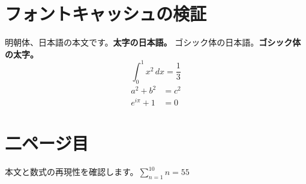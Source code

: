 \documentclass[a4paper,11pt]{ltjsarticle}
\begin{document}
\section{フォントキャッシュの検証}
明朝体、日本語の本文です。\textbf{太字の日本語。}
\textsf{ゴシック体の日本語。}\textsf{\textbf{ゴシック体の太字。}}
\begin{equation} \int_0^1 x^2\,dx = \frac{1}{3} \end{equation}
\begin{align} a^2+b^2&=c^2 \\ e^{i\pi}+1&=0 \end{align}
\newpage
\section{二ページ目}
本文と数式の再現性を確認します。\(\sum_{n=1}^{10}n=55\)
\end{document}
